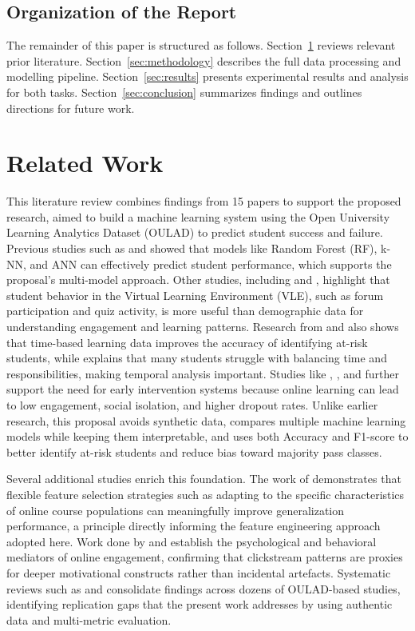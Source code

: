\documentclass[conference]{IEEEtran}
\begin{document}
\subsection{Organization of the Report}
The remainder of this paper is structured as follows. Section~\ref{sec:related} reviews relevant prior literature. Section~\ref{sec:methodology} describes the full data processing and modelling pipeline. Section~\ref{sec:results} presents experimental results and analysis for both tasks. Section~\ref{sec:conclusion} summarizes findings and outlines directions for future work.

\section{Related Work}
\label{sec:related}

This literature review combines findings from 15 papers to support the proposed research, aimed to build a machine learning system using the Open University Learning Analytics Dataset (OULAD) to predict student success and failure. Previous studies such as \cite{1} and \cite{3} showed that models like Random Forest (RF), k-NN, and ANN can effectively predict student performance, which supports the proposal's multi-model approach. Other studies, including \cite{2} and \cite{14}, highlight that student behavior in the Virtual Learning Environment (VLE), such as forum participation and quiz activity, is more useful than demographic data for understanding engagement and learning patterns. Research from \cite{9} and \cite{16} also shows that time-based learning data improves the accuracy of identifying at-risk students, while \cite{10} explains that many students struggle with balancing time and responsibilities, making temporal analysis important. Studies like \cite{5}, \cite{7}, and \cite{11} further support the need for early intervention systems because online learning can lead to low engagement, social isolation, and higher dropout rates. Unlike earlier research, this proposal avoids synthetic data, compares multiple machine learning models while keeping them interpretable, and uses both Accuracy and F1-score to better identify at-risk students and reduce bias toward majority pass classes.

Several additional studies enrich this foundation. The work of \cite{6} demonstrates that flexible feature selection strategies such as adapting to the specific characteristics of online course populations can meaningfully improve generalization performance, a principle directly informing the feature engineering approach adopted here. Work done by \cite{4} and \cite{8} establish the psychological and behavioral mediators of online engagement, confirming that clickstream patterns are proxies for deeper motivational constructs rather than incidental artefacts. Systematic reviews such as \cite{12} and \cite{15} consolidate findings across dozens of OULAD-based studies, identifying replication gaps that the present work addresses by using authentic data and multi-metric evaluation.
\end{document}
